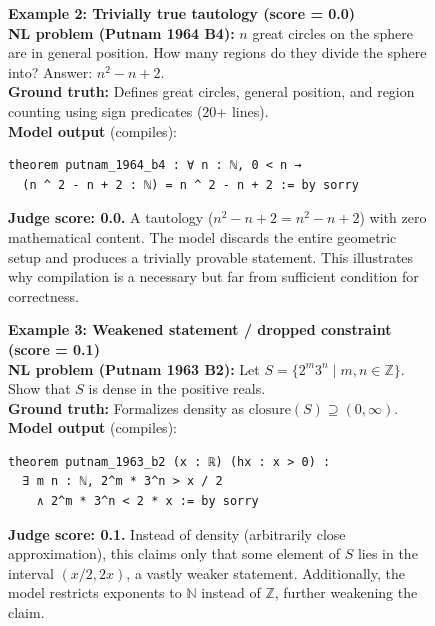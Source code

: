 \documentclass[11pt,a4paper]{article}
\begin{document}
\begin{figure}[H]
\begin{mdframed}[backgroundcolor=codebg, linecolor=codeframe, linewidth=0.6pt, roundcorner=2pt]
{\small
\textbf{Example 2: Trivially true tautology (score = 0.0)}\\[4pt]
\textbf{NL problem (Putnam 1964 B4):} $n$ great circles on the sphere are in general position. How many regions do they divide the sphere into? Answer: $n^2 - n + 2$.\\[4pt]
\textbf{Ground truth:} Defines great circles, general position, and region counting using sign predicates (20+ lines).\\[4pt]
\textbf{Model output} (compiles):
\begin{lstlisting}
theorem putnam_1964_b4 : ∀ n : ℕ, 0 < n →
  (n ^ 2 - n + 2 : ℕ) = n ^ 2 - n + 2 := by sorry
\end{lstlisting}
\textbf{Judge score: 0.0.} A tautology ($n^2 - n + 2 = n^2 - n + 2$) with zero mathematical content. The model discards the entire geometric setup and produces a trivially provable statement. This illustrates why compilation is a necessary but far from sufficient condition for correctness.
}
\end{mdframed}
\end{figure}

\begin{figure}[H]
\begin{mdframed}[backgroundcolor=codebg, linecolor=codeframe, linewidth=0.6pt, roundcorner=2pt]
{\small
\textbf{Example 3: Weakened statement / dropped constraint (score = 0.1)}\\[4pt]
\textbf{NL problem (Putnam 1963 B2):} Let $S = \{2^m 3^n \mid m, n \in \mathbb{Z}\}$. Show that $S$ is dense in the positive reals.\\[4pt]
\textbf{Ground truth:} Formalizes density as $\text{closure}(S) \supseteq (0, \infty)$.\\[4pt]
\textbf{Model output} (compiles):
\begin{lstlisting}
theorem putnam_1963_b2 (x : ℝ) (hx : x > 0) :
  ∃ m n : ℕ, 2^m * 3^n > x / 2
    ∧ 2^m * 3^n < 2 * x := by sorry
\end{lstlisting}
\textbf{Judge score: 0.1.} Instead of density (arbitrarily close approximation), this claims only that some element of $S$ lies in the interval $(x/2, 2x)$, a vastly weaker statement. Additionally, the model restricts exponents to $\mathbb{N}$ instead of $\mathbb{Z}$, further weakening the claim.
}
\end{mdframed}
\end{figure}
\end{document}
